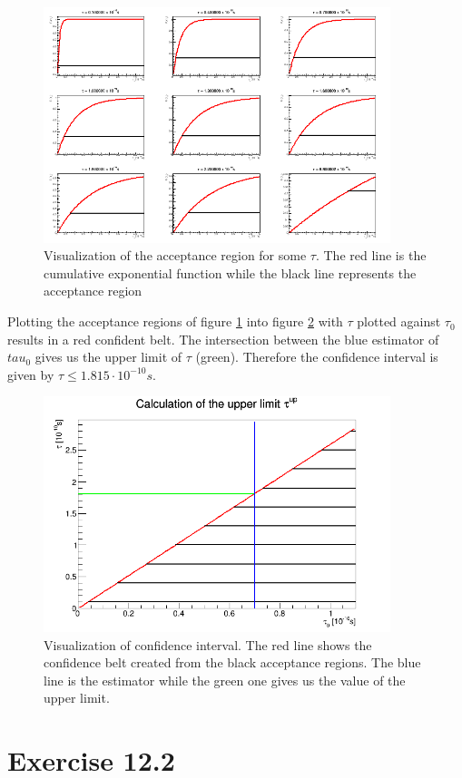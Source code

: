 \documentclass[10pt]{article}
\newenvironment{myfont}{\fontfamily{put}\selectfont}{\par}
\begin{document}
\begin{myfont}
\begin{figure}
    \centering
    \includegraphics[width=0.9\textwidth]{exercise12_1a.png}
    \caption{Visualization of the acceptance region for some $\tau$. The red line is the cumulative exponential function while the black line represents the acceptance region}
    \label{fig:accRegion}
\end{figure}

Plotting the acceptance regions of figure \ref{fig:accRegion} into figure \ref{fig:upperCI} with $\tau$ plotted against $\tau_0$ results in a red confident belt. The intersection between the blue estimator of $tau_0$ gives us the upper limit of $\tau$ (green). Therefore the confidence interval is given by $\tau \leq 1.815 \cdot 10^{-10} \si{s}$.  

\begin{figure}
    \centering
    \includegraphics[width=0.9\textwidth]{exercise12_1b.png}
    \caption{Visualization of confidence interval. The red line shows the confidence belt created from the black acceptance regions. The blue line is the estimator while the green one gives us the value of the upper limit.}
    \label{fig:upperCI}
\end{figure}

\section*{Exercise 12.2}

\end{myfont}
\end{document}
